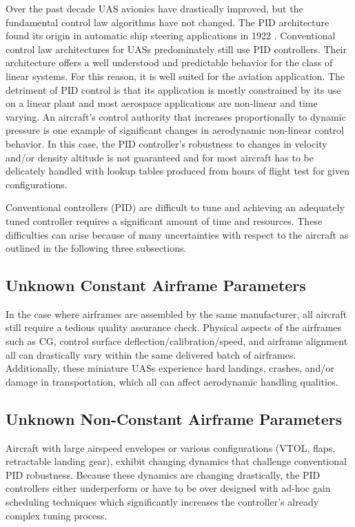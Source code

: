 Over the past decade \ac{UAS} avionics have drastically improved, but the fundamental control law algorithms have not changed.  The \ac{PID} architecture found its origin in automatic ship steering applications in 1922 \cite{minorsky1922pid}.  Conventional control law architectures for \ac{UAS}s predominately still use \ac{PID} controllers.  Their architecture offers a well understood and predictable behavior for the class of linear systems.  For this reason, it is well suited for the aviation application.  The detriment of \ac{PID} control is that its application is mostly constrained by its use on a linear plant and most aerospace applications are non-linear and time varying.   An aircraft's control authority that increases proportionally to dynamic pressure is one example of significant changes in aerodynamic non-linear control behavior.  In this case, the \ac{PID} controller's robustness to changes in velocity and/or density altitude is not guaranteed and for most aircraft has to be delicately handled with lookup tables produced from hours of flight test for given configurations.

Conventional controllers (\ac{PID}) are difficult to tune and achieving an adequately tuned controller requires a significant amount of time and resources.  These difficulties can arise because of many uncertainties with respect to the aircraft as outlined in the following three subsections.

\subsection{Unknown Constant Airframe Parameters}
In the case where airframes are assembled by the same manufacturer, all aircraft still require a tedious quality assurance check.  Physical aspects of the airframes such as \ac{CG}, control surface deflection/calibration/speed, and airframe alignment all can drastically vary within the same delivered batch of airframes.  Additionally, these miniature \ac{UAS}s experience hard landings, crashes, and/or damage in transportation, which all can affect aerodynamic handling qualities.

\subsection{Unknown Non-Constant Airframe Parameters}
Aircraft with large airspeed envelopes or various configurations (\ac{VTOL}, flaps, retractable landing gear), exhibit changing dynamics that challenge conventional \ac{PID} robustness.  Because these dynamics are changing drastically, the \ac{PID} controllers either underperform or have to be over designed with ad-hoc gain scheduling techniques which significantly increases the controller's already complex tuning process.  

